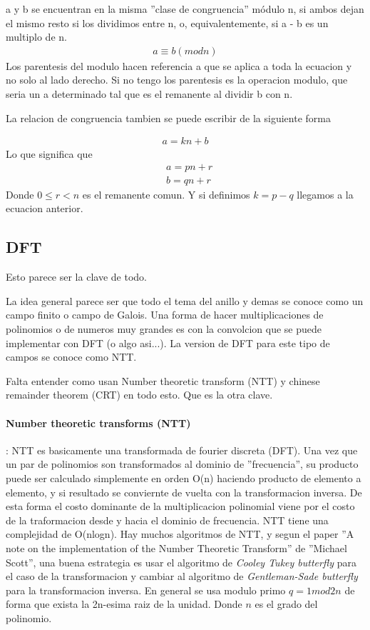 \documentclass[12pt, oneside]{article}
\begin{document}
a y b se encuentran en la misma ''clase de congruencia'' módulo n, si ambos dejan
el mismo resto si los dividimos entre n, o, equivalentemente, si a - b es un multiplo de n.
\begin{align*}
a\equiv b (mod n)
\end{align*}
Los parentesis del modulo hacen referencia a que se aplica a toda la ecuacion y no
solo al lado derecho.
Si no tengo los parentesis es la operacion modulo, que seria un a determinado tal que
es el remanente al dividir b con n.

La relacion de congruencia tambien se puede escribir de la siguiente forma

\begin{align*}
  a = kn + b
\end{align*}
Lo que significa que
\begin{align*}
  &a = pn + r \\
  &b = qn + r
\end{align*}
Donde $0\leq r <n$ es el remanente comun.
Y si definimos $k=p-q$ llegamos a la ecuacion anterior.
\subsection{DFT}
Esto parece ser la clave de todo.


La idea general parece ser que todo el tema del anillo y demas se conoce
como un campo finito o campo de Galois.
Una forma de hacer multiplicaciones  de polinomios o de numeros muy grandes es
con la convolcion que se puede implementar con DFT (o algo asi...).
La version de DFT para este tipo de campos se conoce como NTT.


Falta entender como usan Number theoretic transform (NTT) y chinese remainder
theorem (CRT) en todo esto.
Que es la otra clave.

\paragraph{Number theoretic transforms (NTT)}:
NTT es basicamente una transformada de fourier discreta (DFT).
Una vez que un par de polinomios son transformados al dominio de ''frecuencia'',
su producto puede ser calculado simplemente en orden O(n) haciendo producto de elemento
a elemento, y si resultado se conviernte de vuelta con la transformacion inversa.
De esta forma el costo dominante de la multiplicacion polinomial viene por el costo
de la traformacion desde y hacia el dominio de frecuencia.
NTT tiene una complejidad de O(nlogn).
Hay muchos algoritmos de NTT, y segun el paper ''A note on the implementation of the Number
Theoretic Transform'' de ''Michael Scott'',  una buena estrategia es usar
el algoritmo de \textit{Cooley Tukey butterfly} para el caso de la transformacion
y cambiar al algoritmo de \textit{Gentleman-Sade butterfly} para la transformacion
inversa.
En general se usa modulo primo $q=1 mod 2n$ de forma que exista la 2n-esima raiz de
la unidad.
Donde $n$ es el grado del polinomio.
\end{document}
